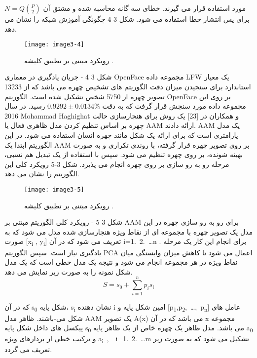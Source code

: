 $N = Q \binom{P}{2}$
مورد استفاده قرار می گیرند. خطای سه گانه محاسبه شده و مشتق آن برای پس انتشار خطا استفاده می شود. شکل 3-4 چگونگی آموزش شبکه را نشان می دهد.
 \begin{figure}[h]
\centering
  \texttt{[image: image3-4]}
  \caption{رویکرد مبتنی بر تطبیق کلیشه  \cite{ref1}.}
  \label{image2-1}
\end{figure}
شکل ‏3 4 - جریان یادگیری در معماری OpenFace
مجموعه داده LFW  یک معیار استاندارد برای سنجیدن میزان دقت الگوریتم های تشخیص چهره می باشد که از 13233 تصویر چهره از 5750 شخص تشکیل شده است. الگوریتم OpenFace بر روی این مجموعه داده مورد سنجش قرار گرفت که به دقت
 $0.9292\pm0.0134 \%$ 
 رسید.
در سال 2016 Mohammad Haghighat و همکاران در [23] یک روش برای هنجارسازی حالت چهره بر اساس تنظیم کردن مدل  ظاهری فعال  یا AAM ارائه دادند. AAM یک مدل پارامتری است که برای ارائه یک شکل مانند چهره انسان استفاده می شود. در این الگوریتم ابتدا یک AAM بر روی تصویر چهره قرار گرفته، با روندی تکراری و به صورت بهینه شونده، بر روی چهره تنظیم می شود. سپس با استفاده از یک تبدیل هم نسبی، مرحله رو به رو سازی بر روی چهره انجام می پذیرد. شکل 3-5 رویکرد کلی این الگوریتم را نشان می دهد. 
 \begin{figure}[h]
\centering
  \texttt{[image: image3-5]}
  \caption{رویکرد مبتنی بر تطبیق کلیشه  \cite{ref1}.}
  \label{image2-1}
\end{figure}
شکل ‏3 5 - رویکرد کلی الگوریتم مبتنی بر AAM برای رو به رو سازی چهره
در این مدل یک تصویر چهره با مجموعه ای از نقاط ویژه هنجارسازی شده مدل می شود که به صورت
[x\textsubscript{i} , y\textsubscript{i}]
تعریف می شود که در آن
i=1.\ 2.\ \ldots n .
برای انجام این کار یک مرحله یادگیری نیاز است. سپس الگوریتم PCA اعمال می شود تا کاهش میزان وابستگی میان نقاط ویژه در هر مجموعه انجام می شود و نتیجه یک مدل خطی است که یک مدل شکل نمونه را به صورت زیر نمایش می دهد.
\begin{equation}\label{eq3-1}
S=s_0+\sum_{i=1}^{n}{p_is_i}
\end{equation}
	
که در آن
s\textsubscript{0}
شکل پایه،
s\textsubscript{i}
نشان دهنده i امین شکل پایه و
[p\textsubscript{1},p\textsubscript{2},\ \ldots,\ p\textsubscript{n}]
عامل های شکل می-باشند. ظاهر  مدل AAM یک تصویر A(x) می باشد که در آن x مجموعه پیکسل های داخل شکل پایه
s\textsubscript{0}
می باشد. مدل ظاهر یک چهره خاص از یک ظاهر پایه
a\textsubscript{0}
و ترکیب خطی از بردارهای ویژه
a\textsubscript{i}\ ,\ \ i=1.\ 2.\ \ldots m
تشکیل می شود که به صورت زیر تعریف می گردد.

